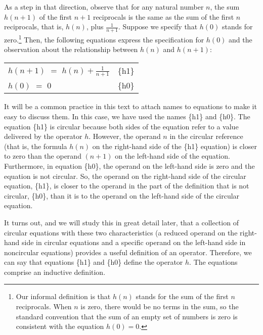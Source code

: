 As a step in that direction, observe that for any natural number $n$,
the sum $h(n+1)$ of the first $n+1$ reciprocals
is the same as the sum of the first $n$ reciprocals, that is, $h(n)$, plus $\frac{1}{n+1}$.
Suppose we specify that $h(0)$ stands for zero.\footnote{Our
informal definition is that $h(n)$ stands for the sum of the first $n$ reciprocals.
When $n$ is zero, there would be no terms in the sum,
so the standard convention that the sum of an empty set of numbers
is zero is consistent with the equation $h(0) = 0$.}
Then, the following equations express the specification for $h(0)$ and
the observation about the relationship between $h(n)$ and $h(n+1)$:
\begin{center}
\begin{tabular}{ll}
$h(n+1)$ $=$ $h(n) + \frac{1}{n+1}$ & \{h1\}\\
$h(0)$   $=$ $0$                    & \{h0\}\\
\end{tabular}
\end{center}\label{reciprocalsdef}

It will be a common practice in this text to
attach names to equations to make it easy to discuss them.
In this case, we have used the names \{h1\} and \{h0\}.
The equation \{h1\} is circular
because both sides of the equation refer to a value delivered by the operator $h$.
However, the operand $n$ in the circular reference
(that is, the formula $h(n)$ on the right-hand side of the \{h1\} equation)
is closer to zero than the operand $(n+1)$ on the left-hand side of the equation.
Furthermore, in equation \{h0\}, the operand on the left-hand side is zero and
the equation is not circular.
So, the operand on the right-hand side of the circular equation, \{h1\},
is closer to the operand in the part of the definition
that is not circular, \{h0\}, than it is to the operand on the
left-hand side of the circular equation.

It turns out, and we will study this in great detail later,
that a collection of circular equations with
these two characteristics
(a reduced operand on the right-hand side in circular equations
and a specific operand on the left-hand side in noncircular equations)
provides a useful definition of an operator.
Therefore, we can say that equations \{h1\} and \{h0\}
define the operator $h$.
The equations comprise an inductive definition.

